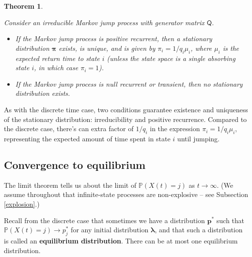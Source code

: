 \documentclass[
  a4paper,
]{article}
\providecommand{\tightlist}{%
  \setlength{\itemsep}{0pt}\setlength{\parskip}{0pt}}
\newtheorem{theorem}{Theorem}[section]
\theoremstyle{definition}
\theoremstyle{definition}
\theoremstyle{definition}
\theoremstyle{remark}
\begin{document}
\begin{theorem}
\protect\hypertarget{thm:statex-cont}{}\label{thm:statex-cont}

Consider an irreducible Markov jump process with generator matrix \(\mathsf Q\).

\begin{itemize}
\tightlist
\item
  If the Markov jump process is positive recurrent, then a stationary distribution \(\boldsymbol \pi\) exists, is unique, and is given by \(\pi_i = 1/q_i\mu_{i}\), where \(\mu_{i}\) is the expected return time to state \(i\) (unless the state space is a single absorbing state \(i\), in which case \(\pi_i = 1\)).
\item
  If the Markov jump process is null recurrent or transient, then no stationary distribution exists.
\end{itemize}

\end{theorem}

As with the discrete time case, two conditions guarantee existence and uniqueness of the stationary distribution: irreducibility and positive recurrence. Compared to the discrete case, there's can extra factor of \(1/q_i\) in the expression \(\pi_i = 1/q_i\mu_{i}\), representing the expected amount of time spent in state \(i\) until jumping.

\hypertarget{convergernce-cont}{%
\subsection{Convergence to equilibrium}\label{convergernce-cont}}

The limit theorem tells us about the limit of \(\mathbb P(X(t) = j)\) as \(t \to \infty\). (We assume throughout that infinite-state processes are non-explosive -- see Subsection \ref{explosion}.)

Recall from the discrete case that sometimes we have a distribution \(\mathbf p^*\) such that \(\mathbb P(X(t) = j) \to p^*_j\) for any initial distribution \(\boldsymbol\lambda\), and that such a distribution is called an \textbf{equilibrium distribution}. There can be at most one equilibrium distribution.
\end{document}
